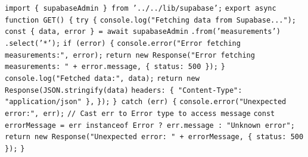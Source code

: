 \begin{algorithmic}[1]
	\STATE \texttt{import \{ supabaseAdmin \} from '../../lib/supabase';}
	\STATE \texttt{export async function GET() \{}
	\STATE \hspace{0.5cm} \texttt{try \{}
	\STATE \hspace{1.0cm} \texttt{console.log("Fetching data from Supabase...");}
	\STATE \hspace{1.0cm} \texttt{const \{ data, error \} = await supabaseAdmin}
	\STATE \hspace{1.5cm} \texttt{.from('measurements')}
	\STATE \hspace{1.5cm} \texttt{.select('*');}
	\STATE \hspace{1.0cm} \texttt{if (error) \{}
	\STATE \hspace{1.5cm} \texttt{console.error("Error fetching measurements:", error);}
	\STATE \hspace{1.5cm} \texttt{return new Response("Error fetching measurements: " + error.message, \{ status: 500 \});}
	\STATE \hspace{1.0cm} \texttt{\}}
	\STATE \hspace{1.0cm} \texttt{console.log("Fetched data:", data);}
	\STATE \hspace{1.0cm} \texttt{return new Response(JSON.stringify(data)}
	\STATE \hspace{1.5cm} \texttt{headers: \{ "Content-Type": "application/json" \},}
	\STATE \hspace{1.0cm} \texttt{\});}
	\STATE \hspace{0.5cm} \texttt{\} catch (err) \{}
	\STATE \hspace{1.0cm} \texttt{console.error("Unexpected error:", err);}
	\STATE \hspace{1.0cm} \texttt{// Cast err to Error type to access message}
	\STATE \hspace{1.0cm} \texttt{const errorMessage = err instanceof Error ? err.message : "Unknown error";}
	\STATE \hspace{1.0cm} \texttt{return new Response("Unexpected error: " + errorMessage, \{ status: 500 \});}
	\STATE \hspace{0.5cm} \texttt{\}}
\end{algorithmic}

\clearpage



